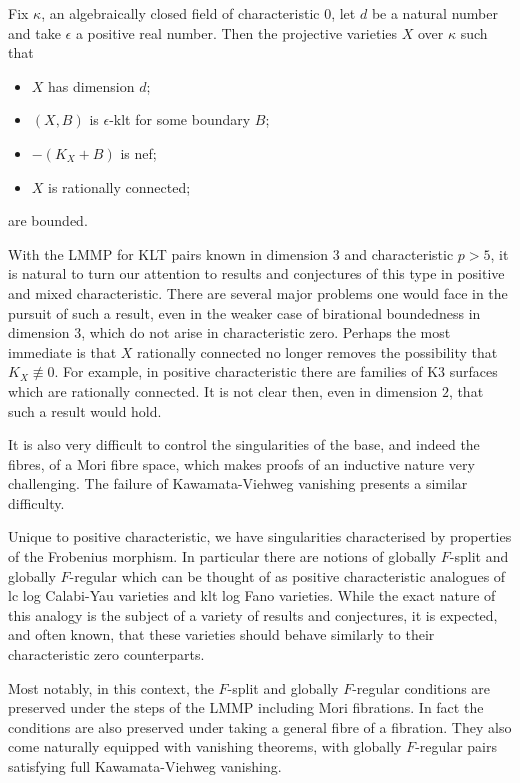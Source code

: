 \documentclass[a4paper,12pt]{book}
\begin{document}
	\begin{conjecture}
		Fix $\kappa$, an algebraically closed field of characteristic $0$, let $d$ be a natural number and take $\epsilon$ a positive real number. Then the projective varieties $X$ over $\kappa$ such that 
		\begin{itemize}
			\item $X$ has dimension $d$;
			\item $(X,B)$ is $\epsilon$-klt for some boundary $B$;
			\item $-(K_{X}+B)$ is nef;
			\item $X$ is rationally connected;
		\end{itemize}
		are bounded.	
	\end{conjecture}

	With the LMMP for KLT pairs known in dimension $3$ and characteristic $p>5$, it is natural to turn our attention to results and conjectures of this type in positive and mixed characteristic. There are several major problems one would face in the pursuit of such a result, even in the weaker case of birational boundedness in dimension $3$, which do not arise in characteristic zero. Perhaps the most immediate is that $X$ rationally connected no longer removes the possibility that $K_{X} \not\equiv 0$. For example, in positive characteristic there are families of K3 surfaces which are rationally connected. It is not clear then, even in dimension $2$, that such a result would hold.
	
	It is also very difficult to control the singularities of the base, and indeed the fibres, of a Mori fibre space, which makes proofs of an inductive nature very challenging. The failure of Kawamata-Viehweg vanishing presents a similar difficulty.
	
	Unique to positive characteristic, we have singularities characterised by properties of the Frobenius morphism. In particular there are notions of globally $F$-split and globally $F$-regular which can be thought of as positive characteristic analogues of lc log Calabi-Yau varieties and klt log Fano varieties. While the exact nature of this analogy is the subject of a variety of results and conjectures, it is expected, and often known, that these varieties should behave similarly to their characteristic zero counterparts.
	
	Most notably, in this context, the $F$-split and globally $F$-regular conditions are preserved under the steps of the LMMP including Mori fibrations. In fact the conditions are also preserved under taking a general fibre of a fibration. They also come naturally equipped with vanishing theorems, with globally $F$-regular pairs satisfying full Kawamata-Viehweg vanishing. 
	
\end{document}
